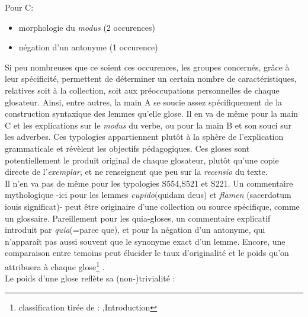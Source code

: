 \documentclass[a4paper, twoside, 12pt]{book}
\begin{document}
Pour C:

\begin{itemize}
    \item {} morphologie du \textit{modus} (2 occurences)
    \item {} négation d'un antonyme (1 occurence)
\end{itemize}

Si peu nombreuses que ce soient ces occurences, les groupes concernés, grâce à leur spécificité, permettent de déterminer un certain nombre de caractéristiques, relatives soit à la collection, soit aux préoccupations personnelles de chaque glosateur. Ainsi, entre autres, la main A se soucie assez spécifiquement de la construction syntaxique des lemmes qu'elle glose. Il en va de même pour la main C et les explications sur le \textit{modus} du verbe, ou pour la main B et son souci sur les adverbes. Ces typologies appartiennent plutôt à la sphère de l'explication grammaticale et révèlent les objectifs pédagogiques. Ces gloses sont potentiellement le produit original de chaque glosateur, plutôt qu'une copie directe de l'\textit{exemplar}, et ne renseignent que peu sur la \textit{recensio} du texte.\\

Il n'en va pas de même pour les typologies S554,S521 et S221. Un commentaire mythologique -ici pour les lemmes \textit{cupido}(quidam deus) et \textit{flamen} (sacerdotum iouis significat)- peut être originaire d'une collection ou source spécifique, comme un glossaire. Pareillement pour les \og{}quia-gloses\fg{}, un commentaire explicatif introduit par \textit{quia}(=parce que), et pour la négation d'un antonyme, qui n'apparaît pas aussi souvent que le synonyme exact d'un lemme. Encore, une comparaison entre temoins peut élucider le taux  d'originalité et le \og{}poids\fg{} qu'on attribuera à chaque glose\footnote{classification tirée de : \cite{steinova2021glosses},Introduction} .\\

Le poids d'une glose reflète sa (non-)trivialité :
\end{document}
